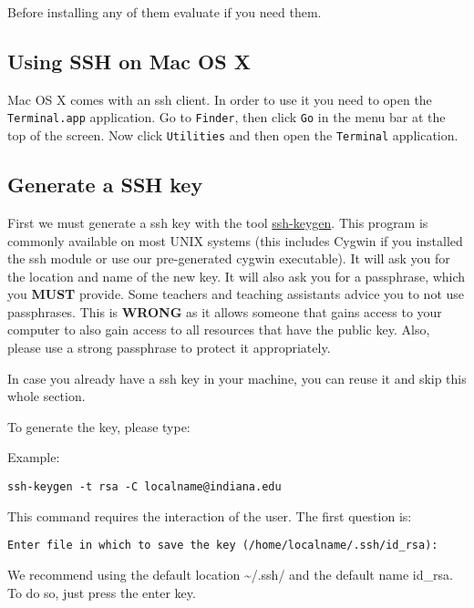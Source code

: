 Before installing any of them evaluate if you need them.

\subsection{Using SSH on Mac OS X}\label{using-ssh-on-mac-os-x}

Mac OS X comes with an ssh client. In order to use it you need to open
the \texttt{Terminal.app} application. Go to \texttt{Finder}, then click
\texttt{Go} in the menu bar at the top of the screen. Now click
\texttt{Utilities} and then open the \texttt{Terminal} application.

\subsection{Generate a SSH key}\label{generate-a-ssh-key}

First we must generate a ssh key with the tool
\href{http://linux.die.net/man/1/ssh-keygen}{ssh-keygen}. This program
is commonly available on most UNIX systems (this includes Cygwin if you
installed the ssh module or use our pre-generated cygwin executable). It
will ask you for the location and name of the new key. It will also ask
you for a passphrase, which you \textbf{MUST} provide. Some teachers and
teaching assistants advice you to not use passphrases. This is
\textbf{WRONG} as it allows someone that gains access to your computer
to also gain access to all resources that have the public key. Also,
please use a strong passphrase to protect it appropriately.

In case you already have a ssh key in your machine, you can reuse it and
skip this whole section.

To generate the key, please type:

Example:

\begin{verbatim}
ssh-keygen -t rsa -C localname@indiana.edu
\end{verbatim}

This command requires the interaction of the user. The first question
is:

\begin{verbatim}
Enter file in which to save the key (/home/localname/.ssh/id_rsa): 
\end{verbatim}

We recommend using the default location \textasciitilde{}/.ssh/ and the
default name id\_rsa. To do so, just press the enter key.

